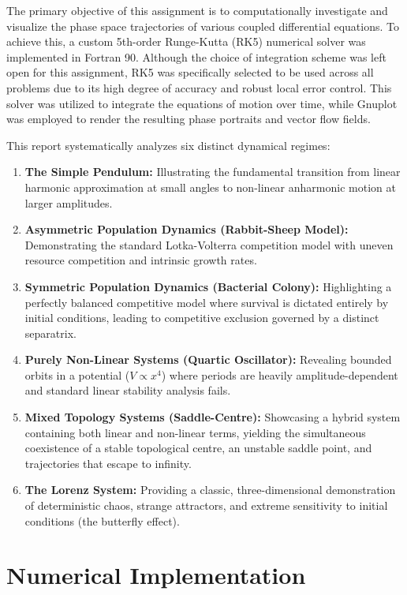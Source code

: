 \documentclass[12pt, a4paper, twoside]{article}
\begin{document}
        The primary objective of this assignment is to computationally investigate and visualize the phase space trajectories of various coupled differential equations. To achieve this, a custom 5th-order Runge-Kutta (RK5) numerical solver was implemented in Fortran 90. Although the choice of integration scheme was left open for this assignment, RK5 was specifically selected to be used across all problems due to its high degree of accuracy and robust local error control. This solver was utilized to integrate the equations of motion over time, while Gnuplot was employed to render the resulting phase portraits and vector flow fields.

        This report systematically analyzes six distinct dynamical regimes:
        \begin{enumerate}
            \item {\bf The Simple Pendulum:} Illustrating the fundamental transition from linear harmonic approximation at small angles to non-linear anharmonic motion at larger amplitudes.
            \item {\bf Asymmetric Population Dynamics (Rabbit-Sheep Model):} Demonstrating the standard Lotka-Volterra competition model with uneven resource competition and intrinsic growth rates.
            \item {\bf Symmetric Population Dynamics (Bacterial Colony):} Highlighting a perfectly balanced competitive model where survival is dictated entirely by initial conditions, leading to competitive exclusion governed by a distinct separatrix.
            \item {\bf Purely Non-Linear Systems (Quartic Oscillator):} Revealing bounded orbits in a potential ($V \propto x^4$) where periods are heavily amplitude-dependent and standard linear stability analysis fails.
            \item {\bf Mixed Topology Systems (Saddle-Centre):} Showcasing a hybrid system containing both linear and non-linear terms, yielding the simultaneous coexistence of a stable topological centre, an unstable saddle point, and trajectories that escape to infinity.
            \item {\bf The Lorenz System:} Providing a classic, three-dimensional demonstration of deterministic chaos, strange attractors, and extreme sensitivity to initial conditions (the butterfly effect).
        \end{enumerate}

    \section{Numerical Implementation}
\end{document}
